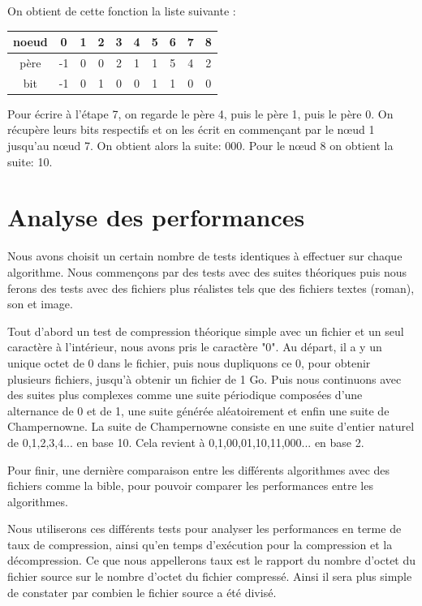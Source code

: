 \documentclass{report}
\begin{document}
On obtient de cette fonction la liste suivante :
\begin{center}
\begin{tabular}{|c|c|c|c|c|c|c|c|c|c|}
\hline
noeud & 0 & 1 & 2 & 3 & 4 & 5 & 6 & 7 & 8 \\
\hline
père & -1 & 0 & 0 & 2 & 1 & 1 & 5 & 4 & 2\\
\hline
bit & -1 & 0 & 1 & 0 & 0 & 1 & 1 & 0 & 0 \\
\hline 
\end{tabular}
\end{center}
 
Pour écrire à l'étape 7, on regarde le père 4, puis le père 1, puis le père 0. 
On récupère leurs bits respectifs et on les écrit en commençant par le nœud  1 jusqu'au nœud 7. On obtient alors la suite: 000.
Pour le nœud 8 on obtient la suite: 10. 



\part*{Analyse des performances}
Nous avons choisit un certain nombre de tests identiques à effectuer sur chaque algorithme. Nous commençons par des tests avec des suites théoriques puis nous ferons des tests avec des fichiers plus réalistes tels que des fichiers textes (roman), son et image.
 
Tout d'abord un test de compression théorique simple avec un fichier et un seul caractère à l'intérieur, nous avons pris le caractère "0".
Au départ, il a y un unique octet de 0 dans le fichier, puis nous dupliquons ce 0, pour obtenir plusieurs fichiers, jusqu'à obtenir un fichier de 1 Go.
Puis nous continuons avec des suites plus complexes comme une suite périodique composées d'une alternance de 0 et de 1, une suite générée aléatoirement et enfin une suite de Champernowne.
La suite de Champernowne consiste en une suite d'entier naturel de 0,1,2,3,4... en base 10. Cela revient à 0,1,00,01,10,11,000... en base 2.   

Pour finir, une dernière comparaison entre les différents algorithmes avec des fichiers comme la bible, pour pouvoir comparer les performances entre les algorithmes.

Nous utiliserons ces différents tests pour analyser les performances en terme de taux de compression, ainsi qu'en temps d'exécution pour la compression et la décompression. 
Ce que nous appellerons taux est le rapport du nombre d'octet du fichier source sur le nombre d'octet du fichier compressé. Ainsi il sera plus simple de constater par combien le fichier source a été divisé. 
\end{document}
